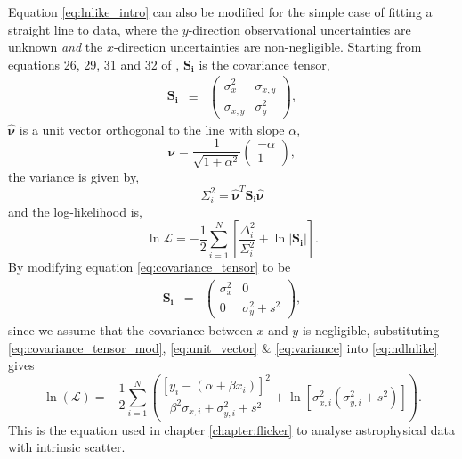 Equation \ref{eq:lnlike_intro} can also be modified for the simple case of
fitting a straight line to data, where the $y$-direction observational
uncertainties are unknown {\it and} the $x$-direction uncertainties are
non-negligible.
Starting from equations 26, 29, 31 and 32 of \citet{Hogg2010},
$\mathbf{S_i}$ is the covariance tensor,
\begin{eqnarray}
    \mathbf{S_i} &\equiv& \left( \begin{array}{cc}
                    \sigma_{x}^2 & \sigma_{x,y} \\
                    \sigma_{x,y} & \sigma_{y}^2
\end{array}\right),
\end{eqnarray}
\label{eq:covariance_tensor}
$\mathbf{\hat{\nu}}$ is a unit vector orthogonal to the line with slope
$\alpha$,
\begin{equation}
    \mathbf{\hat{\nu}} = \frac{1}{\sqrt{1 + \alpha^2}} \left( \begin{array}{c}
                                                    -\alpha \\
                                                    1
    \end{array}\right),
\end{equation}
\label{eq:unit_vector}
the variance is given by,
\begin{equation}
    \Sigma_i^2 = \mathbf{\hat{\nu}}^T \mathbf{S_i} \mathbf{\hat{\nu}}
\end{equation}
\label{eq:variance}
and the log-likelihood is,
\begin{equation}
    \ln\mathcal{L} = - \frac{1}{2} \sum_{i=1}^N \left[
    \frac{\Delta_i^2}{\Sigma_i^2} + \ln|\mathbf{S_i}| \right].
\end{equation}
\label{eq:ndlnlike}
By modifying equation \ref{eq:covariance_tensor} to be
\begin{eqnarray}
    \mathbf{S_i} &=& \left( \begin{array}{cc}
                    \sigma_{x}^2 & 0 \\
                    0 & \sigma_{y}^2 + s^2
\end{array}\right),
\end{eqnarray}
\label{eq:covariance_tensor_mod}
since we assume that the covariance between $x$ and $y$ is negligible,
substituting \ref{eq:covariance_tensor_mod}, \ref{eq:unit_vector} \&
\ref{eq:variance} into \ref{eq:ndlnlike} gives
\begin{equation}
    \ln(\mathcal{L}) = -\frac{1}{2} \sum_{i=1}^N
    \left( \frac{\left[ y_i - (\alpha + \beta x_i) \right]^2}
    {\beta^2\sigma_{x, i} + \sigma_{y, i}^2 + s^2} + \ln[\sigma_{x,
    i}^2(\sigma_{y, i}^2 + s^2)]
    \right).
\end{equation}
This is the equation used in chapter \ref{chapter:flicker} to analyse
astrophysical data with intrinsic scatter.

